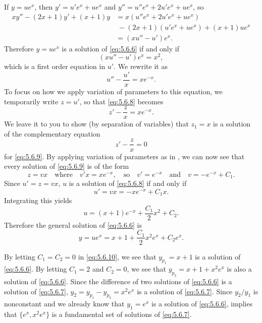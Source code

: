\begin{alistSolution}
\item
If
$y=ue^x$, then $y'=u'e^x+ue^x$ and
$y''=u''e^x+2u'e^x+ue^x$, so
\begin{align*}
xy''-(2x+1)y'+(x+1)y&=x(u''e^x+2u'e^x+ue^x)\\
&\;-(2x+1)(u'e^x+ue^x)+(x+1)ue^x\\
&=(xu''-u')e^x.
\end{align*}
Therefore $y=ue^x$ is a solution of \eqref{eq:5.6.6} if and only if
\[
(xu''-u')e^x=x^2,
\]
which is a first order equation in $u'$. We rewrite it as
\begin{equation} \label{eq:5.6.8}
u''-\frac{u'}{x}=xe^{-x}.
\end{equation}
To focus on how we apply variation of parameters to this equation, we
temporarily write $z=u'$, so that \eqref{eq:5.6.8} becomes
\begin{equation} \label{eq:5.6.9}
z'-\frac{z}{x}=xe^{-x}.
\end{equation}
We leave it to you to show (by separation of variables) that $z_1=x$
is a solution of the complementary equation
\[
z'-\frac{z}{x}=0
\]
for \eqref{eq:5.6.9}. By applying variation of parameters as in
, we can now see that every solution of
\eqref{eq:5.6.9} is of the form
\[
z=vx\quad\text{where}\quad
v'x=xe^{-x}, \quad\text{so}\quad v'=e^{-x} \quad\text{and}\quad 
v=-e^{-x}+C_1.
\]
Since $u'=z=vx$,   $u$ is a solution of \eqref{eq:5.6.8} if and only if
\[
u'=vx=-xe^{-x}+C_1x.
\]
Integrating this yields
\[
u=(x+1)e^{-x}+\frac{C_1}{2}x^2+C_2.
\]
Therefore the general solution of  \eqref{eq:5.6.6} is
\begin{equation} \label{eq:5.6.10}
y=ue^x=x+1+\frac{C_1}{2}x^2e^x+C_2e^x.
\end{equation}

\item By letting $C_1=C_2=0$ in \eqref{eq:5.6.10}, we see that
$y_{p_1}=x+1$ is a solution of \eqref{eq:5.6.6}. By letting $C_1=2$ and
$C_2=0$, we see that $y_{p_2}=x+1+x^2e^x$ is also a solution of
\eqref{eq:5.6.6}. Since the difference of two solutions of \eqref{eq:5.6.6} is
a solution of \eqref{eq:5.6.7},
$y_2=y_{p_1}-y_{p_2}=x^2e^x$ is a solution of \eqref{eq:5.6.7}. Since
$y_2/y_1$ is nonconstant and we already know  that $y_1=e^x$ is a
solution of \eqref{eq:5.6.6},  implies that
$\{e^x,x^2e^x\}$ is a fundamental set of solutions of
\eqref{eq:5.6.7}.
\end{alistSolution}


